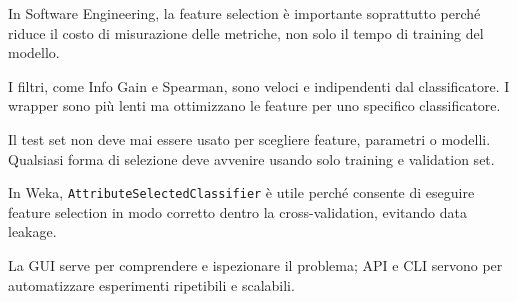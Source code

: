 \begin{notaesame}
In Software Engineering, la feature selection è importante soprattutto perché riduce il costo di misurazione delle metriche, non solo il tempo di training del modello.
\end{notaesame}

\begin{notaesame}
I filtri, come Info Gain e Spearman, sono veloci e indipendenti dal classificatore. I wrapper sono più lenti ma ottimizzano le feature per uno specifico classificatore.
\end{notaesame}

\begin{notaesame}
Il test set non deve mai essere usato per scegliere feature, parametri o modelli. Qualsiasi forma di selezione deve avvenire usando solo training e validation set.
\end{notaesame}

\begin{notaesame}
In Weka, \texttt{AttributeSelectedClassifier} è utile perché consente di eseguire feature selection in modo corretto dentro la cross-validation, evitando data leakage.
\end{notaesame}

\begin{notaesame}
La GUI serve per comprendere e ispezionare il problema; API e CLI servono per automatizzare esperimenti ripetibili e scalabili.
\end{notaesame}
